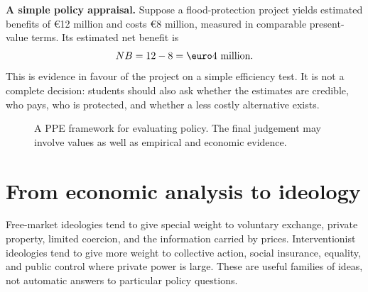 \begin{exercisebox}
\textbf{A simple policy appraisal.}
Suppose a flood-protection project yields estimated benefits of \euro12 million
and costs \euro8 million, measured in comparable present-value terms. Its
estimated net benefit is
\[
NB=12-8=\text{\euro4 million}.
\]
This is evidence in favour of the project on a simple efficiency test. It is
not a complete decision: students should also ask whether the estimates are
credible, who pays, who is protected, and whether a less costly alternative
exists.
\end{exercisebox}

\begin{figure}[htbp]
  \centering
  \caption{A PPE framework for evaluating policy. The final judgement may
  involve values as well as empirical and economic evidence.}
  \label{fig:ppe-policy-evaluation}
\end{figure}
\FloatBarrier

\section{From economic analysis to ideology}

Free-market ideologies tend to give special weight to voluntary exchange,
private property, limited coercion, and the information carried by prices.
Interventionist ideologies tend to give more weight to collective action,
social insurance, equality, and public control where private power is large.
These are useful families of ideas, not automatic answers to particular
policy questions.

